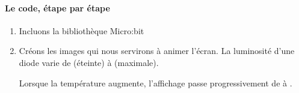 \documentclass[letterpaper,10pt,french]{sphinxmanual}
\begin{document}
\paragraph{Le code, étape par étape}
\label{\detokenize{projets/temperature-coder:le-code-etape-par-etape}}\begin{enumerate}
\item {} 
Incluons la bibliothèque Micro:bit

%
\begin{sphinxVerbatim}[commandchars=\\\{\}]
   
\end{sphinxVerbatim}

\item {} 
Créons les images qui nous servirons à animer l’écran.
La luminosité d’une diode varie de  (éteinte)
à  (maximale).

Lorsque la température augmente, l’affichage passe progressivement
de  à .


\end{enumerate}
\end{document}
